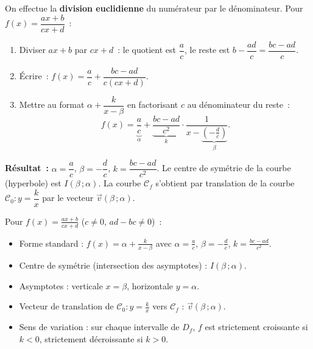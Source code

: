 \documentclass[11pt]{article}
\newcommand{\cle}[1]{{\popxbold\color{popdark}#1}}
\begin{document}
\begin{methode}[Mise sous forme standard $f(x) = \alpha + \dfrac{k}{x-\beta}$]
On effectue la \textbf{division euclidienne} du numérateur par le dénominateur.
Pour $f(x) = \dfrac{ax+b}{cx+d}$~:
\begin{enumerate}
    \item Diviser $ax+b$ par $cx+d$~: le quotient est $\dfrac{a}{c}$, le reste est $b - \dfrac{ad}{c} = \dfrac{bc-ad}{c}$.
    \item Écrire~: $f(x) = \dfrac{a}{c} + \dfrac{bc-ad}{c(cx+d)}$.
    \item Mettre au format $\alpha + \dfrac{k}{x-\beta}$ en factorisant $c$ au dénominateur du reste~:
    \[
    f(x) = \underbrace{\frac{a}{c}}_{\alpha} + \underbrace{\frac{bc-ad}{c^2}}_{k} \cdot \frac{1}{x - \underbrace{\left(-\frac{d}{c}\right)}_{\beta}}.
    \]
\end{enumerate}
\textbf{Résultat~:} $\alpha = \dfrac{a}{c}$, $\beta = -\dfrac{d}{c}$, $k = \dfrac{bc-ad}{c^2}$.
Le centre de symétrie de la courbe (hyperbole) est $I(\beta\,; \alpha)$.
La courbe $\mathcal{C}_f$ s'obtient par \cle{translation} de la courbe $\mathcal{C}_0 : y = \dfrac{k}{x}$ par le vecteur $\vec{v}(\beta\,; \alpha)$.
\end{methode}

\begin{aretenir}
Pour $f(x) = \frac{ax+b}{cx+d}$ ($c \neq 0$, $ad-bc \neq 0$)~:
\begin{itemize}
    \item Forme standard : $f(x) = \alpha + \frac{k}{x-\beta}$ avec $\alpha = \frac{a}{c}$, $\beta = -\frac{d}{c}$, $k = \frac{bc-ad}{c^2}$.
    \item Centre de symétrie (intersection des asymptotes) : $I(\beta\,; \alpha)$.
    \item Asymptotes : verticale $x = \beta$, horizontale $y = \alpha$.
    \item Vecteur de translation de $\mathcal{C}_0 : y = \frac{k}{x}$ vers $\mathcal{C}_f$ : $\vec{v}(\beta\,; \alpha)$.
    \item Sens de variation : sur chaque intervalle de $D_f$, $f$ est strictement croissante si $k<0$, strictement décroissante si $k>0$.
\end{itemize}
\end{aretenir}
\end{document}
